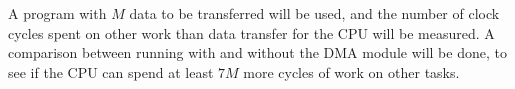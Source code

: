 A program with $M$ data to be transferred will be used, and the number of clock cycles spent on other work than data transfer for the CPU will be measured.
A comparison between running with and without the DMA module will be done, to see if the CPU can spend at least $7M$ more cycles of work on other tasks.


